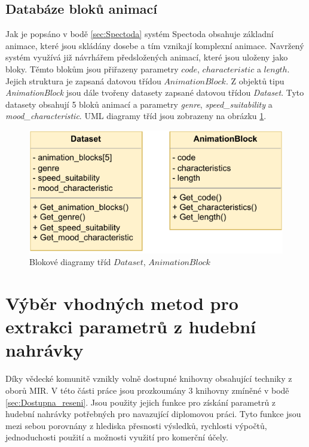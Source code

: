 \subsection{Databáze bloků animací} \label{sec:Database_structure}
Jak je popsáno v bodě \ref{sec:Spectoda} systém Spectoda obsahuje základní animace, které jsou skládány dosebe a tím vznikají komplexní animace. Navržený systém využívá již návrhářem předsložených animací, které jsou uloženy jako bloky. Těmto blokům jsou přiřazeny parametry $code$, $characteristic$ a $length$. Jejich struktura je zapsaná datovou třídou $AnimationBlock$.
Z objektů tipu \textit{AnimationBlock} jsou dále tvořeny datasety zapsané datovou třídou \textit{Dataset}. Tyto datasety obsahují 5 bloků animací a parametry \textit{genre}, \textit{speed\_suitability} a \textit{mood\_characteristic}. UML diagramy tříd jsou zobrazeny na obrázku \ref{fig:UML_diagram_Dataset_AnimationBlock}.

\begin{figure}[H]
    \centering
    \includegraphics[width = 0.7\linewidth]{obrazky/UML_diagram_Dataset_and_AnimationBlock.pdf}
    \caption{Blokové diagramy tříd $Dataset$, $AnimationBlock$}
    \label{fig:UML_diagram_Dataset_AnimationBlock}
\end{figure}

\section{Výběr vhodných metod pro extrakci parametrů z hudební nahrávky} \label{sec:Exktrakce_vlastnosti_metody}
Díky vědecké komunitě vznikly volně dostupné knihovny obsahující techniky z oborů MIR. V této části práce jsou prozkoumány 3 knihovny zmíněné v bodě \ref{sec:Dostupna_reseni}. Jsou použity jejich funkce pro získání parametrů z hudební nahrávky potřebných pro navazující diplomovou práci. Tyto funkce jsou mezi sebou porovnány z hlediska přesnosti výsledků, rychlosti výpočtů, jednoduchosti použití a možnosti využití pro komerční účely. 


